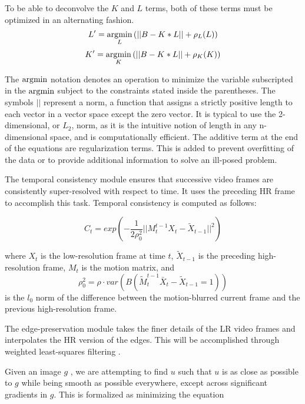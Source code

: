 To be able to deconvolve the $K$ and $L$ terms, both of these terms must be optimized in an alternating fashion.
\begin{equation}
L' = \operatorname*{\arg\!\min}_L{(||B-K*L||+\rho_L(L))}
\end{equation}
\begin{equation}
K' = \operatorname*{\arg\!\min}_K{(||B-K*L||+\rho_K(K))}
\end{equation}

The $\operatorname*{\arg\!\min}$ notation denotes an operation to minimize the variable subscripted in the $\operatorname*{\arg\!\min}$ subject to the constraints stated inside the parentheses.
The symbols $||$ represent a norm, a function that assigns a strictly positive length to each vector in a vector space except the zero vector.
It is typical to use the 2-dimensional, or $L_2$, norm, as it is the intuitive notion of length in any n-dimensional space, and is computationally efficient.
The additive term at the end of the equations are regularization terms.
This is added to prevent overfitting of the data or to provide additional information to solve an ill-posed problem.

The temporal consistency module ensures that successive video frames are consistently super-resolved with respect to time. 
It uses the preceding HR frame to accomplish this task.
Temporal consistency is computed as follows:

\begin{equation}
	C_t = exp(-\frac{1}{2\rho_0^2}||M_t^{t-1}X_t-\widetilde{X}_{t-1}||^2)
\end{equation}

where $X_t$ is the low-resolution frame at time $t$, $\widetilde{X}_{t-1}$ is the preceding high-resolution frame, $M_t$ is the motion matrix, and
\begin{equation}
\rho_0^2 = \rho \cdot var(B(\widetilde{M}_t^{t-1}\bar{X}_t-\widetilde{X}_{t-1} = 1))
\end{equation}
is the $l_0$ norm of the difference between the motion-blurred current frame and the previous high-resolution frame.

The edge-preservation module takes the finer details of the LR video frames and interpolates the HR version of the edges. 
This will be accomplished through weighted least-squares filtering \citep{Farbman2008}.

Given an image $g$ , we are attempting to find $u$ such that $u$ is as close as possible to $g$ while being smooth as possible everywhere, except across significant gradients in $g$. 
This is formalized as minimizing the equation

